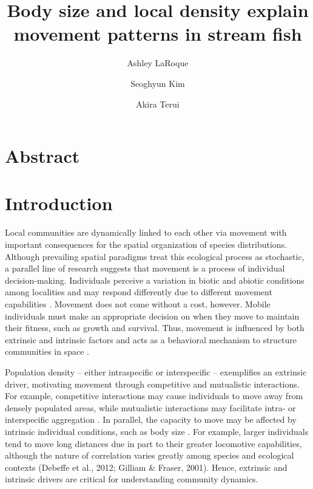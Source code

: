 \documentclass[11pt, class=article, crop=false]{standalone}
\title{Body size and local density explain movement patterns in stream fish}
\date{} %
\author[1]{Ashley LaRoque}
\author[2]{Seoghyun Kim}
\author[1]{Akira Terui}
\affil[1]{Depatment of Biology, University of North Carolina at Greensboro}
\affil[2]{XXX}
\begin{document}
\maketitle

\section{Abstract}

\section{Introduction}

Local communities are dynamically linked to each other via movement with important consequences for the spatial organization of species distributions. Although prevailing spatial paradigms treat this ecological process as stochastic, a parallel line of research suggests that movement is a process of individual decision-making. Individuals perceive a variation in biotic and abiotic conditions among localities and may respond differently due to different movement capabilities \citep{tesfaygebrekirosFactorsAffectingStream2016}. Movement does not come without a cost, however. Mobile individuals must make an appropriate decision on when they move to maintain their fitness, such as growth and survival. Thus, movement is influenced by both extrinsic and intrinsic factors and acts as a behavioral mechanism to structure communities in space \citep{leiboldMetacommunityConceptFramework2004, mcpeekEvolutionPassiveDispersal2024, schlagelMovementmediatedCommunityAssembly2020}. 

Population density – either intraspecific or interspecific – exemplifies an extrinsic driver, motivating movement through competitive and mutualistic interactions. For example, competitive interactions may cause individuals to move away from densely populated areas, while mutualistic interactions may facilitate intra- or interspecific aggregation \citep{thierryInterplayAbioticBiotic2024, rasmussenIndividualMovementStream2017}. In parallel, the capacity to move may be affected by intrinsic individual conditions, such as body size \citep{clobertDispersalEcologyEvolution2012}. For example,  larger individuals tend to move long distances due in part to their greater locomotive capabilities, although the nature of correlation varies greatly among species and ecological contexts \citep{comteEvidenceDispersalSyndromes, teruiParasiteInfectionInduces2017, radingerPatternsPredictorsFish2014, }  (Debeffe et al., 2012; Gilliam \& Fraser, 2001). Hence, extrinsic and intrinsic drivers are critical for understanding community dynamics.
\end{document}
